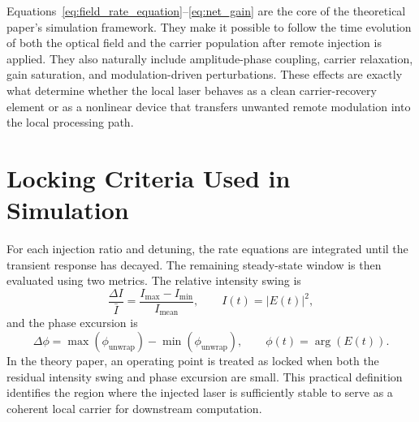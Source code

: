 Equations~\ref{eq:field_rate_equation}--\ref{eq:net_gain} are the core of the theoretical paper's simulation framework. They make it possible to follow the time evolution of both the optical field and the carrier population after remote injection is applied. They also naturally include amplitude-phase coupling, carrier relaxation, gain saturation, and modulation-driven perturbations. These effects are exactly what determine whether the local laser behaves as a clean carrier-recovery element or as a nonlinear device that transfers unwanted remote modulation into the local processing path.

\section{Locking Criteria Used in Simulation}

For each injection ratio and detuning, the rate equations are integrated until the transient response has decayed. The remaining steady-state window is then evaluated using two metrics. The relative intensity swing is
\begin{equation}
    \frac{\Delta I}{\bar{I}}
    =
    \frac{I_{\max}-I_{\min}}{I_{\mathrm{mean}}},
    \qquad I(t)=|E(t)|^2,
    \label{eq:intensity_swing}
\end{equation}
and the phase excursion is
\begin{equation}
    \Delta\phi
    =
    \max\!\left(\phi_{\mathrm{unwrap}}\right)
    -
    \min\!\left(\phi_{\mathrm{unwrap}}\right),
    \qquad \phi(t)=\arg(E(t)).
    \label{eq:phase_excursion}
\end{equation}
In the theory paper, an operating point is treated as locked when both the residual intensity swing and phase excursion are small. This practical definition identifies the region where the injected laser is sufficiently stable to serve as a coherent local carrier for downstream computation.
